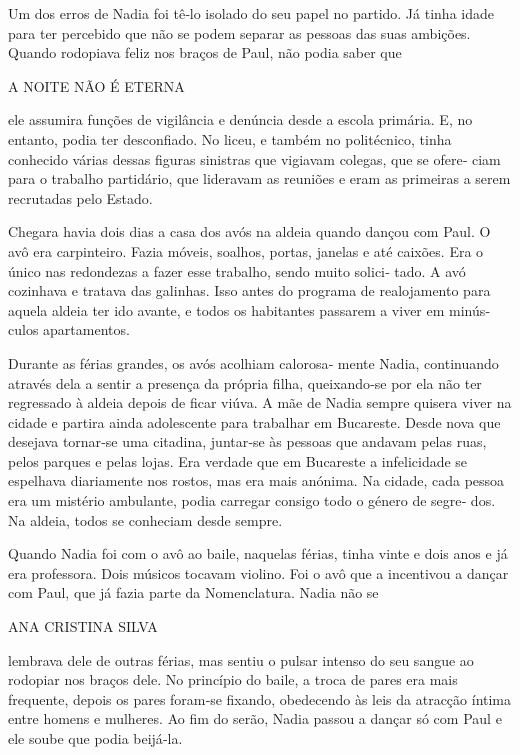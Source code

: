 Um dos erros de Nadia foi tê‑lo isolado do seu papel no partido. Já
tinha idade para ter percebido que não se podem separar as pessoas das
suas ambições. Quando rodopiava feliz nos braços de Paul, não podia
saber que

A NOITE NÃO É ETERNA

ele assumira funções de vigilância e denúncia desde a escola primária.
E, no entanto, podia ter desconfiado. No liceu, e também no politécnico,
tinha conhecido várias dessas figuras sinistras que vigiavam colegas,
que se ofere‑ ciam para o trabalho partidário, que lideravam as reuniões
e eram as primeiras a serem recrutadas pelo Estado.

Chegara havia dois dias a casa dos avós na aldeia quando dançou com
Paul. O avô era carpinteiro. Fazia móveis, soalhos, portas, janelas e
até caixões. Era o único nas redondezas a fazer esse trabalho, sendo
muito solici‑ tado. A avó cozinhava e tratava das galinhas. Isso antes
do programa de realojamento para aquela aldeia ter ido avante, e todos
os habitantes passarem a viver em minús‑ culos apartamentos.

Durante as férias grandes, os avós acolhiam calorosa‑ mente Nadia,
continuando através dela a sentir a presença da própria filha,
queixando‑se por ela não ter regressado à aldeia depois de ficar viúva.
A mãe de Nadia sempre quisera viver na cidade e partira ainda
adolescente para trabalhar em Bucareste. Desde nova que desejava
tornar‑se uma citadina, juntar‑se às pessoas que andavam pelas ruas,
pelos parques e pelas lojas. Era verdade que em Bucareste a infelicidade
se espelhava diariamente nos rostos, mas era mais anónima. Na cidade,
cada pessoa era um mistério ambulante, podia carregar consigo todo o
género de segre‑ dos. Na aldeia, todos se conheciam desde sempre.

Quando Nadia foi com o avô ao baile, naquelas férias, tinha vinte e dois
anos e já era professora. Dois músicos tocavam violino. Foi o avô que a
incentivou a dançar com Paul, que já fazia parte da Nomenclatura. Nadia
não se

ANA CRISTINA SILVA

lembrava dele de outras férias, mas sentiu o pulsar intenso do seu
sangue ao rodopiar nos braços dele. No princípio do baile, a troca de
pares era mais frequente, depois os pares foram‑se fixando, obedecendo
às leis da atracção íntima entre homens e mulheres. Ao fim do serão,
Nadia passou a dançar só com Paul e ele soube que podia beijá‑la.

